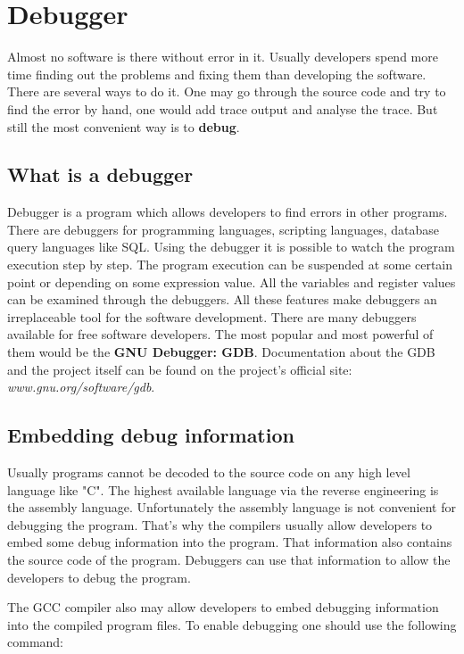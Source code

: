 
\section{Debugger}
\label{debugger}
Almost no software is there without error in it. Usually developers spend more time finding out the problems and fixing them than developing the software. There are several ways to do it. One may go through the source code and try to find the error by hand, one would add trace output and analyse the trace. But still the most convenient way is to {\bf debug}.

\subsection{What is a debugger}
Debugger is a program which allows developers to find errors in other programs. There are debuggers for programming languages, scripting languages, database query languages like SQL. Using the debugger it is possible to watch the program execution step by step. The program execution can be suspended at some certain point or depending on some expression value. All the variables and register values can be examined through the debuggers. All these features make debuggers an irreplaceable tool for the software development. There are many debuggers available for free software developers. The most popular and most powerful of them would be the {\bf GNU Debugger: GDB}. Documentation about the GDB and the project itself can be found on the project's official site: \textit { www.gnu.org/software/gdb}.

\subsection{Embedding debug information}
Usually programs cannot be decoded to the source code on any high level language like "C". The highest available language via the reverse engineering is the assembly language. Unfortunately the assembly language is not convenient for debugging the program. That's why the compilers usually allow developers to embed some debug information into the program. That information also contains the source code of the program. Debuggers can use that information to allow the developers to debug the program. 

The GCC compiler also may allow developers to embed debugging information into the compiled program files. To enable debugging one should use the following command:

